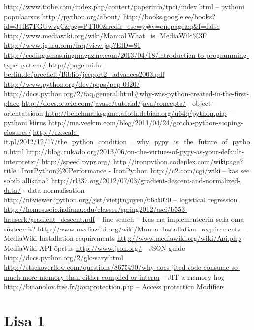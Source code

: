 \documentclass[12pt, a4paper, titlepage, draft]{article}
\begin{document}
\begin{thebibliography}{99}
\url{http://www.tiobe.com/index.php/content/paperinfo/tpci/index.html} –
pythoni populaarsus
\bibitem{}
\url{http://python.org/about/}
\bibitem{}
\url{http://books.google.ee/books?id=3JfE7TGUwvgC&pg=PT100&redir_esc=y#v=onepage&q&f=false}
\bibitem{}
\url{http://www.mediawiki.org/wiki/Manual:What_is_MediaWiki%3F}
\bibitem{}
\url{http://www.jguru.com/faq/view.jsp?EID=81}
\bibitem{}
\url{http://coding.smashingmagazine.com/2013/04/18/introduction-to-programming-type-systems/}
\bibitem{}
\url{http://page.mi.fu-berlin.de/prechelt/Biblio/jccpprt2_advances2003.pdf}
\bibitem{}
\url{http://www.python.org/dev/peps/pep-0020/}
\bibitem{}
\url{http://docs.python.org/2/faq/general.html#why-was-python-created-in-the-first-place}
\bibitem{}
\url{http://docs.oracle.com/javase/tutorial/java/concepts/} - object-orientatsioon
\bibitem{}
\url{http://benchmarksgame.alioth.debian.org/u64q/python.php} – pythoni kiirus
\bibitem{}
\url{http://me.veekun.com/blog/2011/04/24/gotcha-python-scoping-closures/}
\bibitem{}
\url{http://rz.scale-it.pl/2012/12/17/the_python_condition__why_pypy_is_the_future_of_python.html}
\bibitem{}
\url{http://blog.irukado.org/2013/06/on-the-virtues-of-pypy-as-your-default-interpreter/}
\bibitem{}
\url{http://speed.pypy.org/}
\bibitem{}
\url{http://ironpython.codeplex.com/wikipage?title=IronPython\%20Performance} - IronPython
\bibitem{}
\url{http://c2.com/cgi/wiki} – kas see sobib allikana?
\bibitem{}
\url{http://rl337.org/2012/07/03/gradient-descent-and-normalized-data/} - data normalisation
\bibitem{}
\url{http://nbviewer.ipython.org/gist/vietjtnguyen/6655020} – logistical regression
\bibitem{}
\url{http://homes.soic.indiana.edu/classes/spring2012/csci/b553-hauserk/gradient_descent.pdf} – line search – Kas ma implementeerin seda oma süsteemis?
\bibitem{}
\url{http://www.mediawiki.org/wiki/Manual:Installation_requirements} – MediaWiki Installation requirements
\bibitem{}
\url{http://www.mediawiki.org/wiki/Api.php} – MediaWiki API õpetus
\bibitem{}
\url{http://www.json.org/} - JSON guide
\bibitem{}
\url{http://docs.python.org/2/glossary.html}
\bibitem{}
\url{http://stackoverflow.com/questions/8675490/why-does-jited-code-consume-so-much-more-memory-than-either-compiled-or-interpr} – JIT a memory hog
\bibitem{}
\url{http://bmanolov.free.fr/javaprotection.php} – Access protection Modifiers
\end{thebibliography}

\section*{Lisa 1}
\end{document}
